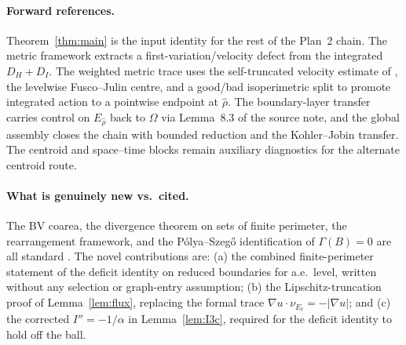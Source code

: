 \documentclass[11pt]{article}
\theoremstyle{definition}
\newcommand{\Om}{\Omega}
\begin{document}
\paragraph{Forward references.} Theorem~\ref{thm:main} is the input
identity for the rest of the Plan~2 chain. The metric framework
\cite{MetricFramework} extracts a first-variation/velocity defect from
the integrated $D_{H}+D_{I}$. The weighted metric trace
\cite{WeightedMetricTrace} uses the self-truncated velocity estimate
of \cite{TrimmedVelocityRepair}, the levelwise Fusco--Julin centre, and
a good/bad isoperimetric split to promote integrated action to a
pointwise endpoint at $\widehat\rho$. The boundary-layer transfer
\cite{BoundaryLayerTransfer} carries control on $E_{\widehat\rho}$ back
to $\Om$ via Lemma~8.3 of the source note, and the global assembly
\cite{GlobalAssembly} closes the chain with bounded reduction and the
Kohler--Jobin transfer.  The centroid and space--time blocks
\cite{CentroidBound,SpaceTimeIdentity} remain auxiliary diagnostics for
the alternate centroid route.

\paragraph{What is genuinely new vs.\ cited.} The BV coarea, the
divergence theorem on sets of finite perimeter, the rearrangement
framework, and the P\'olya--Szeg\H{o} identification of $\Gamma(B)=0$
are all standard \cite{Maggi2012,AFP2000,Talenti1976,Kawohl1985,
PolyaSzego1951,Bandle1980}. The novel contributions are: (a) the
combined finite-perimeter statement of the deficit identity on reduced
boundaries for a.e.\ level, written without any selection or graph-entry
assumption; (b) the Lipschitz-truncation proof of Lemma~\ref{lem:flux},
replacing the formal trace $\nabla u\cdot\nu_{E_{t}}=-|\nabla u|$;
and (c) the corrected $I''=-1/\alpha$ in Lemma~\ref{lem:I3c}, required
for the deficit identity to hold off the ball.
\end{document}
